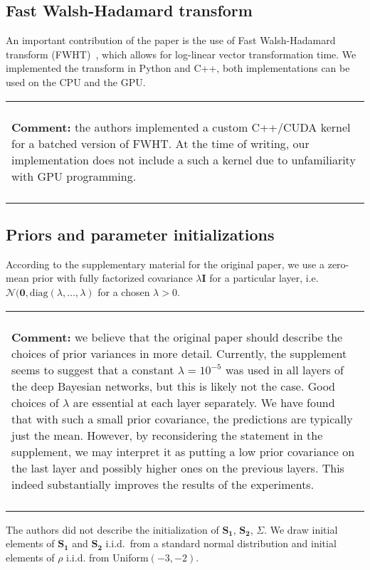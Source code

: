 \documentclass[11pt]{article}
\newenvironment{comment}
    {
    \begin{center}
    \begin{tabular}{|p{0.9\hsize}|}
    \hline\\
    \begin{footnotesize}\textbf{Comment:}}
    {
    \end{footnotesize}
    \\\\\hline
    \end{tabular}
    \end{center}
    }
\begin{document}
    \subsection{Fast Walsh-Hadamard transform}
    An important contribution of the paper is the use of Fast Walsh-Hadamard transform (FWHT)~\cite{fino1976unified}, which allows for log-linear vector transformation time.
    We implemented the transform in Python and C++, both implementations can be used on the CPU and the GPU.
    \begin{comment}
        the authors implemented a custom C++/CUDA kernel for a batched version of FWHT.
        At the time of writing, our implementation does not include a such a kernel due to unfamiliarity with GPU programming.
    \end{comment}

    \subsection{Priors and parameter initializations}
    According to the supplementary material for the original paper, we use a zero-mean prior with fully factorized covariance $\lambda \mathbf{I}$ for a particular layer, i.e. $\mathcal{N}(\mathbf{0}, \mathrm{diag}(\lambda, \dots, \lambda)$ for a chosen $\lambda > 0$.
    \begin{comment}
        we believe that the original paper should describe the choices of prior variances in more detail.
        Currently, the supplement seems to suggest that a constant $\lambda = 10^{-5}$ was used in all layers of the deep Bayesian networks, but this is likely not the case.
        Good choices of $\lambda$ are essential at each layer separately.
        We have found that with such a small prior covariance, the predictions are typically just the mean.
        However, by reconsidering the statement in the supplement, we may interpret it as putting a low prior covariance on the last layer and possibly higher ones on the previous layers.
        This indeed substantially improves the results of the experiments.
    \end{comment}
    The authors did not describe the initialization of $\mathbf{S_1}$, $\mathbf{S_2}$, $\Sigma$.
    We draw initial elements of $\mathbf{S_1}$ and $\mathbf{S_2}$ i.i.d.\ from a standard normal distribution and initial elements of $\rho$ i.i.d. from Uniform$(-3, -2)$.

\end{document}
